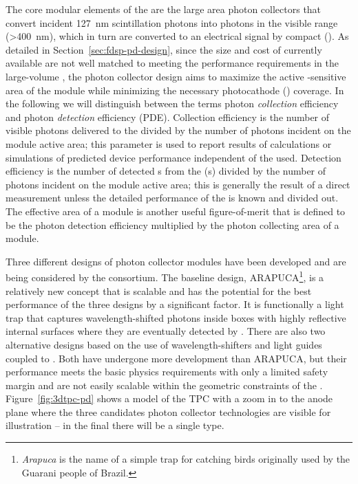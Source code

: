 The core modular elements of the  are the large area photon collectors that convert incident \SI{127}{nm} scintillation photons into photons in the visible range (>\SI{400}{nm}), which in turn are converted to an electrical signal by compact (). 
As detailed in Section~\ref{sec:fdsp-pd-design}, since the size and cost of currently available  are not well matched to meeting the performance requirements in the large-volume  , the photon collector design aims to maximize the active -sensitive area of the  module while minimizing the necessary photocathode () coverage. 
In the following we will distinguish between the terms photon \textit{collection} efficiency and photon \textit{detection} efficiency (PDE). Collection efficiency is the number of visible photons delivered to the  divided by the number of  photons incident on the  module active area; this parameter is used to report results of calculations or simulations of predicted device performance independent of the  used.  Detection efficiency is the number of detected \phel{}s from the (s) divided by the number of  photons incident on the  module active area; this is generally the result of a direct measurement unless the detailed performance of the  is known and divided out. The effective area of a  module is another useful figure-of-merit that is defined to be the photon detection efficiency multiplied by the photon collecting area of a  module. 

Three different designs of  photon collector modules have been developed and are being considered by the \single {} consortium. The baseline design, ARAPUCA\footnote{\textit{Arapuca} is the name of a simple trap for catching birds originally used by the Guarani people of Brazil.}, is a relatively new concept that is scalable and has the potential for the best performance of the three designs by a significant factor. It is functionally a light trap that captures wavelength-shifted photons inside boxes with highly reflective internal surfaces where they are eventually detected by .  There are also two alternative designs based on the use of wavelength-shifters and light guides coupled to . Both have undergone more development than ARAPUCA, but their performance meets the basic physics requirements with only a limited safety margin and are not easily scalable within the geometric constraints of the .
Figure~\ref{fig:3dtpc-pd} shows a \threed model of the \single TPC with a zoom in to the anode plane where the three candidates photon collector technologies are visible for illustration -- in the final  there will be a single type.

